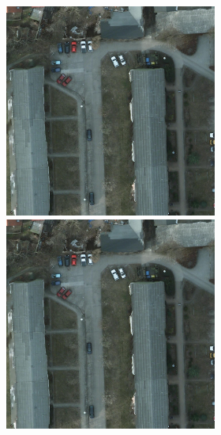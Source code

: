 \begin{figure}
\begin{subfigure}{\textwidth}
\begin{subfigure}{0.25\textwidth}
    \includegraphics[width=\textwidth]{Chapitre2/potsdam}
    \includegraphics[width=\textwidth]{Chapitre2/potsdam}

\end{subfigure}
\end{subfigure}
\end{figure}

